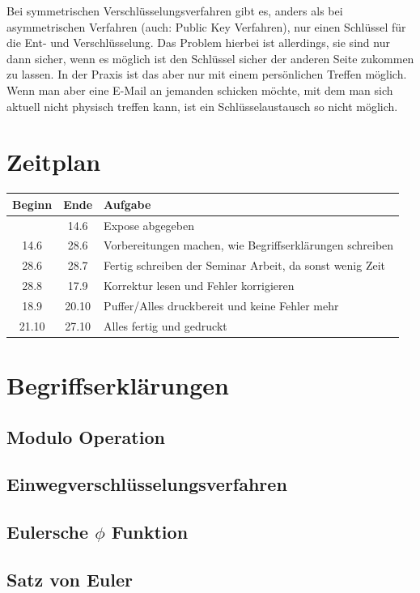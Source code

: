 \documentclass[14pt,a4paper]{scrartcl}
\begin{document}
Bei symmetrischen Verschlüsselungsverfahren gibt es, anders als bei asymmetrischen Verfahren (auch: Public Key Verfahren), nur einen Schlüssel für die Ent- und Verschlüsselung. Das Problem hierbei ist allerdings, sie sind nur dann sicher, wenn es möglich ist den Schlüssel sicher der anderen Seite zukommen zu lassen. In der Praxis ist das aber nur mit einem persönlichen Treffen möglich. Wenn man aber eine E-Mail an jemanden schicken möchte, mit dem man sich aktuell nicht physisch treffen kann, ist ein Schlüsselaustausch so nicht möglich.

\section*{Zeitplan}

	\begin{tabular}{ c | c | p{10cm} }
	Beginn & Ende & Aufgabe\\
	 \hline

 & 14.6 & Expose abgegeben \\
14.6 & 28.6 & Vorbereitungen machen, wie Begriffserklärungen schreiben \\
28.6 & 28.7 & Fertig schreiben der Seminar Arbeit, da sonst wenig Zeit \\
28.8 & 17.9 & Korrektur lesen und Fehler korrigieren\\
18.9 & 20.10 & Puffer/Alles druckbereit und keine Fehler mehr\\
21.10 & 27.10 & Alles fertig und gedruckt
	\end{tabular}
	
	

\section{Begriffserklärungen}
	\subsection{Modulo Operation} %
	\subsection{Einwegverschlüsselungsverfahren}
	\label{ch:einweg}
	\subsection{Eulersche $\phi$ Funktion}
	\subsection{Satz von Euler}
\end{document}
